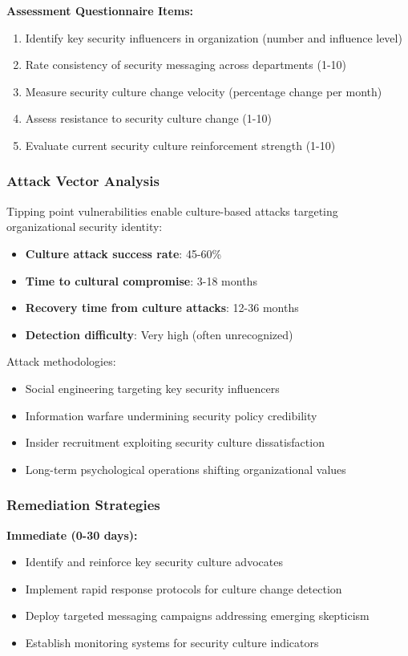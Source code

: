\documentclass[11pt,a4paper]{article}
\begin{document}
\textbf{Assessment Questionnaire Items:}
\begin{enumerate}
\item Identify key security influencers in organization (number and influence level)
\item Rate consistency of security messaging across departments (1-10)
\item Measure security culture change velocity (percentage change per month)
\item Assess resistance to security culture change (1-10)
\item Evaluate current security culture reinforcement strength (1-10)
\end{enumerate}

\subsubsection{Attack Vector Analysis}

Tipping point vulnerabilities enable culture-based attacks targeting organizational security identity:

\begin{itemize}
\item \textbf{Culture attack success rate}: 45-60\%
\item \textbf{Time to cultural compromise}: 3-18 months
\item \textbf{Recovery time from culture attacks}: 12-36 months
\item \textbf{Detection difficulty}: Very high (often unrecognized)
\end{itemize}

Attack methodologies:
\begin{itemize}
\item Social engineering targeting key security influencers
\item Information warfare undermining security policy credibility
\item Insider recruitment exploiting security culture dissatisfaction
\item Long-term psychological operations shifting organizational values
\end{itemize}

\subsubsection{Remediation Strategies}

\textbf{Immediate (0-30 days):}
\begin{itemize}
\item Identify and reinforce key security culture advocates
\item Implement rapid response protocols for culture change detection
\item Deploy targeted messaging campaigns addressing emerging skepticism
\item Establish monitoring systems for security culture indicators
\end{itemize}
\end{document}
